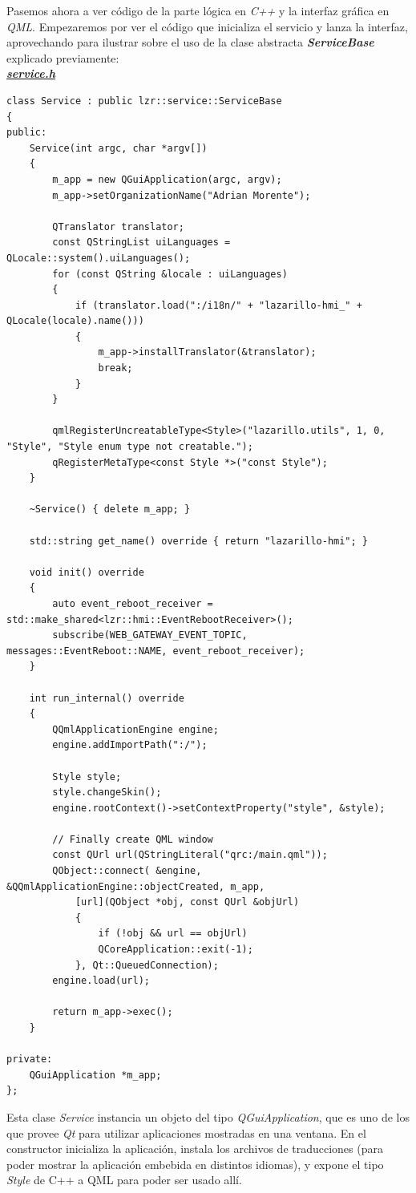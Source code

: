 Pasemos ahora a ver código de la parte lógica en \textit{C++} y la interfaz gráfica en \textit{QML}. Empezaremos por ver el código que inicializa el servicio y lanza la interfaz, aprovechando para ilustrar sobre el uso de la clase abstracta \textbf{\textit{ServiceBase}} explicado previamente:\\

\textbf{\textit{\href{https://github.com/adrianmorente/lazarillo-embedded/blob/master/lazarillo-hmi/inc/lazarillo-hmi/service.h}{service.h}}}
\begin{lstlisting}
class Service : public lzr::service::ServiceBase
{
public:
	Service(int argc, char *argv[])
	{
		m_app = new QGuiApplication(argc, argv);
		m_app->setOrganizationName("Adrian Morente");

		QTranslator translator;
		const QStringList uiLanguages = QLocale::system().uiLanguages();
		for (const QString &locale : uiLanguages)
		{
			if (translator.load(":/i18n/" + "lazarillo-hmi_" + QLocale(locale).name()))
			{
				m_app->installTranslator(&translator);
				break;
			}
		}
		
		qmlRegisterUncreatableType<Style>("lazarillo.utils", 1, 0, "Style", "Style enum type not creatable.");
		qRegisterMetaType<const Style *>("const Style");
	}

	~Service() { delete m_app; }
	
	std::string get_name() override { return "lazarillo-hmi"; }
	
	void init() override
	{
		auto event_reboot_receiver = std::make_shared<lzr::hmi::EventRebootReceiver>();
		subscribe(WEB_GATEWAY_EVENT_TOPIC, messages::EventReboot::NAME, event_reboot_receiver);
	}
	
	int run_internal() override
	{
		QQmlApplicationEngine engine;
		engine.addImportPath(":/");
		
		Style style;
		style.changeSkin();
		engine.rootContext()->setContextProperty("style", &style);
		
		// Finally create QML window
		const QUrl url(QStringLiteral("qrc:/main.qml"));
		QObject::connect( &engine, &QQmlApplicationEngine::objectCreated, m_app,
			[url](QObject *obj, const QUrl &objUrl)
			{
				if (!obj && url == objUrl)
				QCoreApplication::exit(-1);
			}, Qt::QueuedConnection);
		engine.load(url);
		
		return m_app->exec();
	}

private:
	QGuiApplication *m_app;
};
\end{lstlisting}

Esta clase \textit{Service} instancia un objeto del tipo \textit{QGuiApplication}, que es uno de los que provee \textit{Qt} para utilizar aplicaciones mostradas en una ventana. En el constructor inicializa la aplicación, instala los archivos de traducciones (para poder mostrar la aplicación embebida en distintos idiomas), y expone el tipo \emph{Style} de C++ a QML para poder ser usado allí.\\

